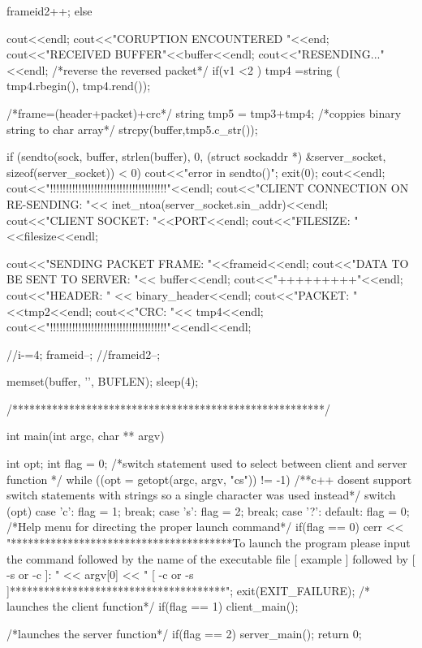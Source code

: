 \documentclass{article}
\begin{document}
\begin{titlepage}
{{{{				frameid2++;
			}
			else
			{
				cout<<endl;
				cout<<"CORUPTION ENCOUNTERED "<<end;
				cout<<"RECEIVED BUFFER"<<buffer<<endl;
				cout<<"RESENDING..."<<endl;
				/*reverse the reversed packet*/
				if(v1 <2 )
  				{
  					tmp4 =string ( tmp4.rbegin(), tmp4.rend());
  				} 
  			
  			
  				/*frame=(header+packet)+crc*/
  				string tmp5 = tmp3+tmp4;
  				/*coppies binary string to char array*/
				strcpy(buffer,tmp5.c_str());
				
				if (sendto(sock, buffer, strlen(buffer), 0, (struct sockaddr *) &server_socket, sizeof(server_socket)) < 0)
				{
				cout<<"error in sendto()";
				exit(0);
				}	
				cout<<endl;
				cout<<"!!!!!!!!!!!!!!!!!!!!!!!!!!!!!!!!!!!!!"<<endl;
				cout<<"CLIENT CONNECTION ON RE-SENDING: "<< inet_ntoa(server_socket.sin_addr)<<endl;
				cout<<"CLIENT SOCKET: "<<PORT<<endl;
				cout<<"FILESIZE: "<<filesize<<endl;
				
				cout<<"SENDING PACKET FRAME: "<<frameid<<endl;
				cout<<"DATA TO BE SENT TO SERVER: "<< buffer<<endl;
				cout<<"+++++++++"<<endl;
				cout<<"HEADER: " << binary_header<<endl;
				cout<<"PACKET: "<<tmp2<<endl;
				cout<<"CRC: "<< tmp4<<endl;
				cout<<"!!!!!!!!!!!!!!!!!!!!!!!!!!!!!!!!!!!!!"<<endl<<endl;
					
				//i-=4;
				frameid--;
				//frameid2--;
			}
			memset(buffer, '\0', BUFLEN);
			sleep(4);
		}
	/*******************************************************/
	}
}


int main(int argc, char ** argv)
{
	int opt;
	int flag = 0;
	/*switch statement used to select between client
	and server function */
	while ((opt = getopt(argc, argv, "cs")) != -1) 
	{
		/**c++ dosent support switch statements with
		strings so a single character was used instead*/
		switch (opt) {
		case 'c':
			flag = 1;
			break;
		case 's':
			flag = 2;
			break;
		case '?':
		default:
			flag = 0;
		}
	}
	/*Help menu for directing the proper launch command*/
	if(flag == 0)
	{
		cerr << "***************************************\n  To launch the program please input the \n [ ./ ]  command followed by the name of \n  the executable file [ example ] followed \n by  [ -s or -c ]: " << argv[0] << " [ -c or -s ]\n ***************************************\n ";
		exit(EXIT_FAILURE);
	}
	/* launches the client function*/
	if(flag == 1)
		client_main();

	/*launches the server function*/
	if(flag == 2)
		server_main();
	return 0;
}

	
	
	
	

\end{titlepage}
\tableofcontents
\listoftables
{}
\end{document}

